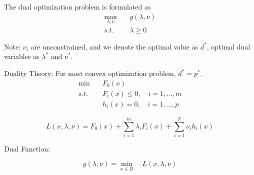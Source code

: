 \begin{definition} The dual optimization problem is formulated as
	\begin{align*}
		\max_{\lambda, \nu} \quad&g(\lambda, \nu) \\
		s.t. \quad&\lambda \geq 0
	\end{align*}
	
	Note: $\nu_i$ are unconstrained, and we denote the optimal value as $d^*$, optimal dual variables as $\lambda^*$ and $\nu^*$.
\end{definition}


\vspace{0.3cm}
Duality Theory: For most convex optimization problem, $d^* = p^*$.\\


\begin{align*}
	\min \quad&F_0(x) \\
	s.t. \quad&F_i(x)\leq 0, \quad i = 1,...,m \\
	&h_i(x)= 0, \quad i = 1,...,p
\end{align*}

\begin{equation*}
	L(x,\lambda,\nu) = F_0(x) + \sum^m_{i=1}\lambda_i F_i(x) + \sum^p_{i=1}\nu_i h_i(x)
\end{equation*}

Dual Function:

\begin{equation*}
	g(\lambda, \nu) = \min_{x\in D}\quad L(x,\lambda,\nu) 
\end{equation*}


